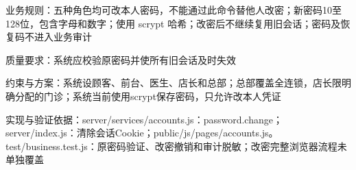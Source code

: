 \documentclass[UTF8,12pt,a4paper,fontset=none]{ctexart}
\begin{document}
业务规则：五种角色均可改本人密码，不能通过此命令替他人改密；新密码10至128位，包含字母和数字；使用 scrypt 哈希；改密后不继续复用旧会话；密码及恢复码不进入业务审计\par
质量要求：系统应校验原密码并使所有旧会话及时失效\par
约束与方案：系统设顾客、前台、医生、店长和总部；总部覆盖全连锁，店长限明确分配的门诊；系统当前使用scrypt保存密码，只允许改本人凭证\par
实现与验证依据：server/\allowbreak{}services/\allowbreak{}accounts.\allowbreak{}js：password.\allowbreak{}change；server/\allowbreak{}index.\allowbreak{}js：清除会话Cookie；public/\allowbreak{}js/\allowbreak{}pages/\allowbreak{}accounts.\allowbreak{}js。test/\allowbreak{}business.\allowbreak{}test.\allowbreak{}js：原密码验证、改密撤销和审计脱敏；改密完整浏览器流程未单独覆盖\par
{}
\end{document}

